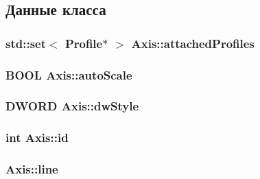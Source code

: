 \subsection{Данные класса}
\hypertarget{class_axis_a4ce6ac30f1b60e366e6a608b30750d9c}{
\subsubsection[{attached\-Profiles}]{\setlength{\rightskip}{0pt plus 5cm}std\-::set$<$ {\bf Profile}$\ast$ $>$ Axis\-::attached\-Profiles\hspace{0.3cm}{\ttfamily [protected]}}}\label{class_axis_a4ce6ac30f1b60e366e6a608b30750d9c}
\hypertarget{class_axis_ae7205720d8bede3b74fab7dd54968d56}{
\subsubsection[{auto\-Scale}]{\setlength{\rightskip}{0pt plus 5cm}B\-O\-O\-L Axis\-::auto\-Scale\hspace{0.3cm}{\ttfamily [protected]}}}\label{class_axis_ae7205720d8bede3b74fab7dd54968d56}
\hypertarget{class_axis_a9b318f5e15215edb80d3a2bdabc11d44}{
\subsubsection[{dw\-Style}]{\setlength{\rightskip}{0pt plus 5cm}D\-W\-O\-R\-D Axis\-::dw\-Style\hspace{0.3cm}{\ttfamily [protected]}}}\label{class_axis_a9b318f5e15215edb80d3a2bdabc11d44}
\hypertarget{class_axis_a12acb583f5bf5f386dc0ea78fa4461aa}{
\subsubsection[{id}]{\setlength{\rightskip}{0pt plus 5cm}int Axis\-::id\hspace{0.3cm}{\ttfamily [protected]}}}\label{class_axis_a12acb583f5bf5f386dc0ea78fa4461aa}
\hypertarget{class_axis_a68817bcf5ea38ff2d81698175ae9c6ee}{
\subsubsection[{line}]{ Axis\-::line\hspace{0.3cm}{\ttfamily [protected]}}}\label{class_axis_a68817bcf5ea38ff2d81698175ae9c6ee}
